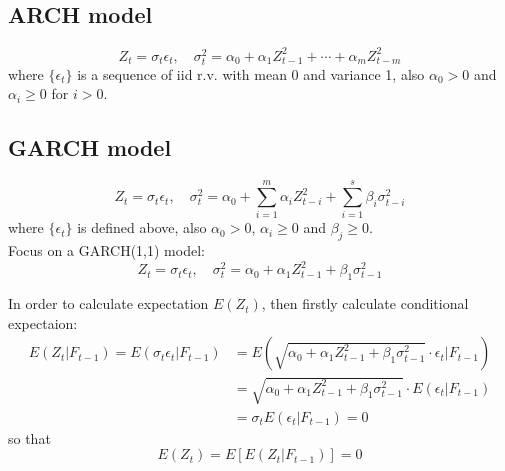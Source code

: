 \documentclass{article}
\begin{document}
\subsection{ARCH model}
\begin{equation*}
Z_{t}=\sigma_{t} \epsilon_{t}, \quad \sigma_{t}^{2}=\alpha_{0}+\alpha_{1} Z_{t-1}^{2}+\cdots+\alpha_{m} Z_{t-m}^{2}
\end{equation*}
where $\{\epsilon_{t}\}$ is a sequence of iid r.v. with mean 0 and variance 1, also $\alpha_0 > 0$ and $\alpha_i \geq 0$ for $i > 0$.

\subsection{GARCH model}
\begin{equation*}
Z_{t} =\sigma_{t} \epsilon_{t}, \quad \sigma_{t}^{2} =\alpha_{0}+\sum_{i=1}^{m} \alpha_{i} Z_{t-i}^{2}+\sum_{i=1}^{s} \beta_{i} \sigma_{t-i}^{2}
\end{equation*}
where $\{\epsilon_{t}\}$ is defined above, also $\alpha_0 > 0$, $\alpha_i \geq 0$ and $\beta_j \geq 0$. \\

\noindent Focus on a GARCH(1,1) model:
\begin{equation*}
Z_{t} =\sigma_{t} \epsilon_{t}, \quad \sigma_{t}^{2}=\alpha_{0}+\alpha_{1} Z_{t-1}^{2}+\beta_{1} \sigma_{t-1}^{2}
\end{equation*}

\noindent In order to calculate expectation $E(Z_t)$, then firstly calculate conditional expectaion:
\begin{equation*}
\begin{aligned} E\left(Z_{t} | F_{t-1}\right)=E\left(\sigma_{t} \epsilon_{t} | F_{t-1}\right)&=E\left(\sqrt{\alpha_{0}+\alpha_{1} Z_{t-1}^{2}+\beta_{1}\sigma_{t-1}^{2}} \cdot \epsilon_{t} | F_{t-1}\right)\\ &=\sqrt{\alpha_{0}+\alpha_{1} Z_{t-1}^{2}+\beta_{1}\sigma_{t-1}^{2}} \cdot E\left(\epsilon_{t} | F_{t-1}\right)\\ &= \sigma_{t} E\left(\epsilon_{t} | F_{t-1}\right)=0
\end{aligned}
\end{equation*}
so that
\begin{equation*}
E (Z_{t})=E\left[E\left(Z_{t} | F_{t-1}\right)\right]=0
\end{equation*}
\end{document}
